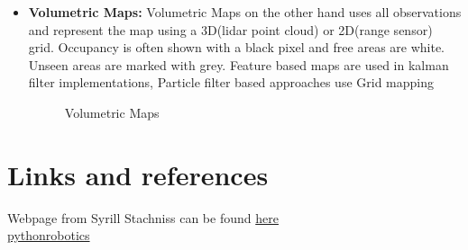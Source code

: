 \documentclass{article}
\begin{document}
\begin{itemize}
\item \textbf{Volumetric Maps:} Volumetric Maps on the other hand uses all observations and represent the map using a 3D(lidar point cloud) or 2D(range sensor) grid. Occupancy is often shown with a black pixel and free areas are white. Unseen areas are marked with grey. Feature based maps are used in kalman filter implementations, Particle filter based approaches use Grid mapping  
    \begin{figure}%
    \centering
    \qquad
    \caption{Volumetric Maps}%
    \label{fig:example}%
    \end{figure}
\end{itemize}

\section{Links and references}

Webpage from Syrill Stachniss can be found \href{http://ais.informatik.uni-freiburg.de/teaching/ws13/mapping/}{here}\\
\href{https://pythonrobotics.readthedocs.io}{pythonrobotics}
\end{document}
